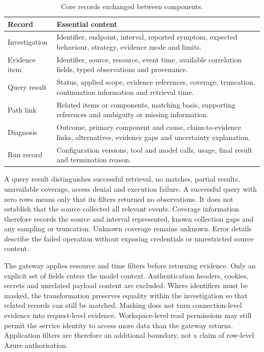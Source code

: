 \begin{table}[htbp]
\centering\small
\caption{Core records exchanged between components.}
\label{tab:design:contracts}
\begin{tabularx}{\textwidth}{@{}>{\raggedright\arraybackslash}p{}>{\raggedright\arraybackslash}X@{}}
\toprule
Record & Essential content \\
\midrule
Investigation & Identifier, endpoint, interval, reported symptom, expected behaviour, strategy, evidence mode and limits. \\
\addlinespace
Evidence item & Identifier, source, resource, event time, available correlation fields, typed observations and provenance. \\
\addlinespace
Query result & Status, applied scope, evidence references, coverage, truncation, continuation information and retrieval time. \\
\addlinespace
Path link & Related items or components, matching basis, supporting references and ambiguity or missing information. \\
\addlinespace
Diagnosis & Outcome, primary component and cause, claim-to-evidence links, alternatives, evidence gaps and uncertainty explanation. \\
\addlinespace
Run record & Configuration versions, tool and model calls, usage, final result and termination reason. \\
\bottomrule
\end{tabularx}
\end{table}

A query result distinguishes successful retrieval, no matches, partial
results, unavailable coverage, access denial and execution failure. A
successful query with zero rows means only that its filters returned no
observations. It does not establish that the source collected all relevant
events. Coverage information therefore records the source and interval
represented, known collection gaps and any sampling or truncation.
Unknown coverage remains unknown. Error details describe the failed
operation without exposing credentials or unrestricted source content.

The gateway applies resource and time filters before returning evidence.
Only an explicit set of fields enters the model context. Authentication
headers, cookies, secrets and unrelated payload content are excluded.
Where identifiers must be masked, the transformation preserves equality
within the investigation so that related records can still be matched.
Masking does not turn connection-level evidence into request-level
evidence. Workspace-level read permissions may still permit the service
identity to access more data than the gateway returns. Application filters
are therefore an additional boundary, not a claim of row-level Azure
authorisation.

